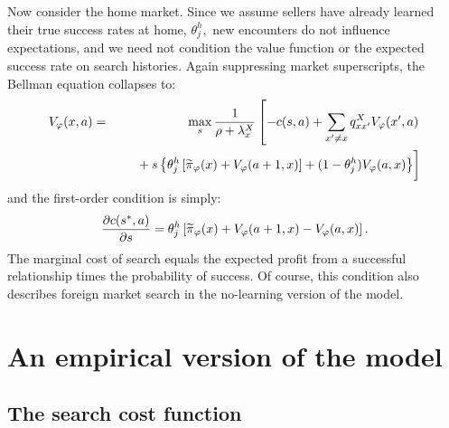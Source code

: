 \documentclass[12pt]{article}
\begin{document}
Now consider the home market. Since we assume sellers have already learned
their true success rates at home, $\theta _{j}^{h},$ new encounters do not
influence expectations, and we need not condition the value function or the
expected success rate on search histories$.$ Again suppressing market
superscripts, the Bellman equation collapses to:%
\begin{eqnarray}
V_{\varphi }(x,a) &=&\max_{s}\frac{1}{\rho +\lambda _{x}^{X}}\left[
-c(s,a)+\sum_{x^{\prime }\neq x}q_{xx^{\prime }}^{X}V_{\varphi }(x^{\prime
},a)\right.  \notag \\
&&\left. 
\begin{array}{c}
\; \\ 
\;%
\end{array}%
+s\left\{ \theta _{j}^{h}\left[ \widetilde{\pi }_{\varphi }(x)+V_{\varphi
}(a+1,x)\right] +(1-\theta _{j}^{h})V_{\varphi }(a,x)\right\} \right]
\end{eqnarray}%
and the first-order condition is simply:%
\begin{equation*}
\frac{\partial c(s^{\ast },a)}{\partial s}=\theta _{j}^{h}\left[ \widetilde{%
\pi }_{\varphi }(x)+V_{\varphi }(a+1,x)-V_{\varphi }(a,x)\right] .
\end{equation*}%
The marginal cost of search equals the expected profit from a successful
relationship times the probability of success. Of course, this condition
also describes foreign market search in the no-learning version of the model.

\section{An empirical version of the model}

\subsection{The search cost function}
\end{document}
